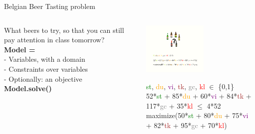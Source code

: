 \documentclass{cons-beamer}
\begin{document}
\begin{frame}{Belgian Beer Tasting problem}
  
  \begin{columns}
    \begin{column}{0.35\textwidth}
      What beers to try, so that you can still pay attention in class tomorrow? \\[2em]
      \textbf{Model =} \\[1em]
      - Variables, with a domain \\[1em]
      - Constraints over variables \\[1em]
      - Optionally: an objective \\[2em]
      \textbf{Model.solve()} \\[2em]
    \end{column}
    \begin{column}{0.65\textwidth}
      {\vspace{-2.5em}
      \includegraphics[height=25mm, trim=0 100mm 0 30mm, clip]{images/beer_taste_prob.png}}

        
      \textcolor{green}{st}, \textcolor{orange}{du}, \textcolor{purple}{vi}, \textcolor{brown}{tk}, \textcolor{gray}{gc}, \textcolor{red}{kl} $\in$ \{0,1\} \\[1em]

        
      {\small 52*\textcolor{green}{st} + 85*\textcolor{orange}{du} + 60*\textcolor{purple}{vi} + 84*\textcolor{brown}{tk} + 117*\textcolor{gray}{gc} + 35*\textcolor{red}{kl} $\leq$ 4*52} \\[1em]

        
      {\small maximize(50*\textcolor{green}{st} + 80*\textcolor{orange}{du} + 75*\textcolor{purple}{vi} + 82*\textcolor{brown}{tk} + 95*\textcolor{gray}{gc} + 70*\textcolor{red}{kl})}
    \end{column}
  \end{columns}
\end{frame}
\end{document}
